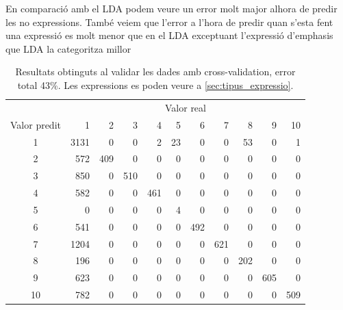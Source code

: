 \documentclass[a4paper]{article}
\begin{document}
En comparació amb el LDA podem veure un error molt major alhora de predir les no expressions. També veiem que l’error a l’hora de predir quan s’esta fent una expressió es molt menor que en el LDA exceptuant l’expressió d’emphasis que LDA la categoritza millor

\begin{table}[H]
	\centering
	\def\arraystretch{1.2}
	\begin{tabular}{|c|rrrrrrrrrr|}
		\hline
		& \multicolumn{10}{c|}{Valor real} \\
		Valor predit & 1 & 2 & 3 & 4 & 5 & 6 & 7 & 8 & 9 & 10 \\
		\hline
		1 & 3131 & 0 & 0 & 2 & 23 & 0 & 0 & 53 & 0 & 1 \\
		2 & 572 & 409 & 0 & 0 & 0 & 0 & 0 & 0 & 0 & 0 \\
		3 & 850 & 0 & 510 & 0 & 0 & 0 & 0 & 0 & 0 & 0 \\
		4 & 582 & 0 & 0 & 461 & 0 & 0 & 0 & 0 & 0 & 0 \\
		5 & 0 & 0 & 0 & 0 & 4 & 0 & 0 & 0 & 0 & 0 \\
		6 & 541 & 0 & 0 & 0 & 0 & 492 & 0 & 0 & 0 & 0 \\
		7 & 1204 & 0 & 0 & 0 & 0 & 0 & 621 & 0 & 0 & 0 \\
		8 & 196 & 0 & 0 & 0 & 0 & 0 & 0 & 202 & 0 & 0 \\
		9 & 623 & 0 & 0 & 0 & 0 & 0 & 0 & 0 & 605 & 0 \\
		10 & 782 & 0 & 0 & 0 & 0 & 0 & 0 & 0 & 0 & 509 \\
		\hline
	\end{tabular}
	\captionsetup{width=0.8\textwidth}
	\caption{Resultats obtinguts al validar les dades amb cross-validation, error total 43\%. Les expressions es poden veure a \autoref{sec:tipus_expressio}.}
\end{table}

\begin{figure}[H]
	\centering
\end{figure}
\end{document}
